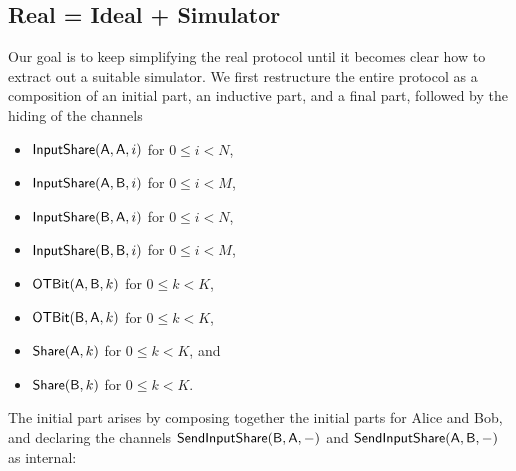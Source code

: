 \subsection{Real = Ideal + Simulator}
Our goal is to keep simplifying the real protocol until it becomes clear how to extract out a suitable simulator. We first restructure the entire protocol as a composition of an initial part, an inductive part, and a final part, followed by the hiding of the channels \smallskip
\begin{itemize}
\item $\mathsf{InputShare}(\mathsf{A},\mathsf{A},i)$ for $0 \leq i < N$,
\item $\mathsf{InputShare}(\mathsf{A},\mathsf{B},i)$ for $0 \leq i < M$,
\item $\mathsf{InputShare}(\mathsf{B},\mathsf{A},i)$ for $0 \leq i < N$,
\item $\mathsf{InputShare}(\mathsf{B},\mathsf{B},i)$ for $0 \leq i < M$,\smallskip
\item $\mathsf{OTBit}(\mathsf{A},\mathsf{B},k)$ for $0 \leq k < K$,
\item $\mathsf{OTBit}(\mathsf{B},\mathsf{A},k)$ for $0 \leq k < K$,\smallskip
\item $\mathsf{Share}(\mathsf{A},k)$ for $0 \leq k < K$, and
\item $\mathsf{Share}(\mathsf{B},k)$ for $0 \leq k < K$.
\end{itemize}

\noindent The initial part arises by composing together the initial parts for Alice and Bob, and declaring the channels $\mathsf{SendInputShare}(\mathsf{B},\mathsf{A},-)$ and $\mathsf{SendInputShare}(\mathsf{A},\mathsf{B},-)$ as internal:

